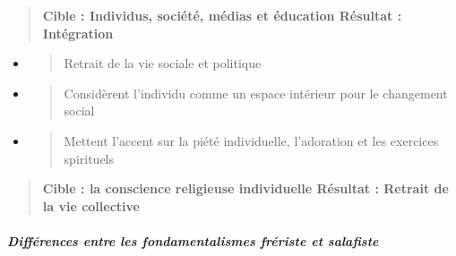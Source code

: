 \begin{quote}
\textbf{Cible : Individus, société, médias et éducation Résultat :
Intégration}
\end{quote}

\begin{itemize}
\item
  \begin{quote}
  Retrait de la vie sociale et politique
  \end{quote}
\item
  \begin{quote}
  Considèrent l'individu comme un espace intérieur pour le changement
  social
  \end{quote}
\item
  \begin{quote}
  Mettent l'accent sur la piété individuelle, l'adoration et les
  exercices spirituels
  \end{quote}
\end{itemize}

\begin{quote}
\textbf{Cible : la conscience religieuse individuelle Résultat : Retrait
de la vie collective}
\end{quote}

\hypertarget{diffuxe9rences-entre-les-fondamentalismes-fruxe9riste-et-salafiste}{%
\subparagraph{Différences entre les fondamentalismes frériste et
salafiste}\label{diffuxe9rences-entre-les-fondamentalismes-fruxe9riste-et-salafiste}}

